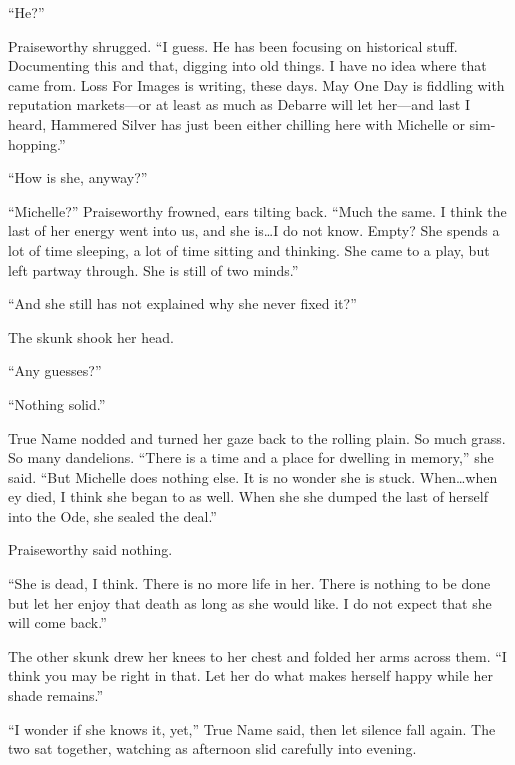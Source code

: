 ``He?''

Praiseworthy shrugged. ``I guess. He has been focusing on historical stuff. Documenting this and that, digging into old things. I have no idea where that came from. Loss For Images is writing, these days. May One Day is fiddling with reputation markets---or at least as much as Debarre will let her---and last I heard, Hammered Silver has just been either chilling here with Michelle or sim-hopping.''

``How is she, anyway?''

``Michelle?'' Praiseworthy frowned, ears tilting back. ``Much the same. I think the last of her energy went into us, and she is\ldots I do not know. Empty? She spends a lot of time sleeping, a lot of time sitting and thinking. She came to a play, but left partway through. She is still of two minds.''

``And she still has not explained why she never fixed it?''

The skunk shook her head.

``Any guesses?''

``Nothing solid.''

True Name nodded and turned her gaze back to the rolling plain. So much grass. So many dandelions. ``There is a time and a place for dwelling in memory,'' she said. ``But Michelle does nothing else. It is no wonder she is stuck. When\ldots when ey died, I think she began to as well. When she she dumped the last of herself into the Ode, she sealed the deal.''

Praiseworthy said nothing.

``She is dead, I think. There is no more life in her. There is nothing to be done but let her enjoy that death as long as she would like. I do not expect that she will come back.''

The other skunk drew her knees to her chest and folded her arms across them. ``I think you may be right in that. Let her do what makes herself happy while her shade remains.''

``I wonder if she knows it, yet,'' True Name said, then let silence fall again. The two sat together, watching as afternoon slid carefully into evening.
